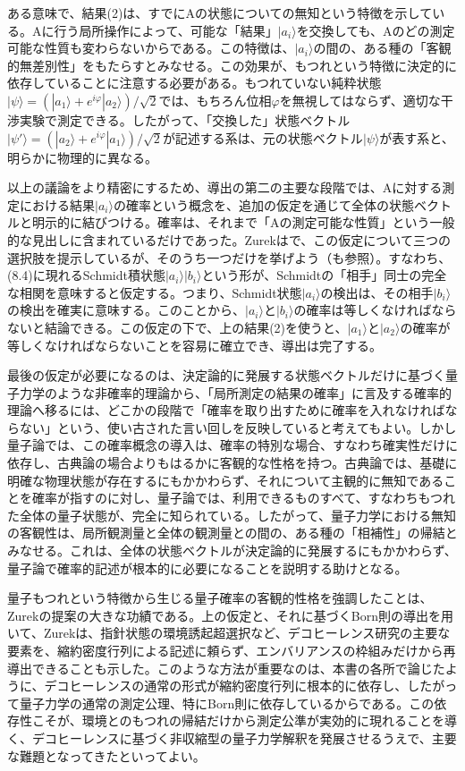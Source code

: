 ある意味で、結果(2)は、すでにAの状態についての無知という特徴を示している。Aに行う局所操作によって、可能な「結果」$|a_i\rangle$を交換しても、Aのどの測定可能な性質も変わらないからである。この特徴は、$|a_i\rangle$の間の、ある種の「客観的無差別性」をもたらすとみなせる。この効果が、もつれという特徴に決定的に依存していることに注意する必要がある。もつれていない純粋状態$|\psi\rangle=(|a_1\rangle+e^{i\varphi}|a_2\rangle)/\sqrt2$では、もちろん位相$\varphi$を無視してはならず、適切な干渉実験で測定できる。したがって、「交換した」状態ベクトル$|\psi'\rangle=(|a_2\rangle+e^{i\varphi}|a_1\rangle)/\sqrt2$が記述する系は、元の状態ベクトル$|\psi\rangle$が表す系と、明らかに物理的に異なる。


\hypertarget{srcpage:343}{}\label{srcpage:343}
以上の議論をより精密にするため、導出の第二の主要な段階では、Aに対する測定における結果$|a_i\rangle$の確率という概念を、追加の仮定を通じて全体の状態ベクトルと明示的に結びつける。確率は、それまで「Aの測定可能な性質」という一般的な見出しに含まれているだけであった。Zurekは\cite{ref067}で、この仮定について三つの選択肢を提示しているが、そのうち一つだけを挙げよう（\cite{ref425}も参照）。すなわち、(8.4)に現れるSchmidt積状態$|a_i\rangle|b_i\rangle$という形が、Schmidtの「相手」同士の完全な相関を意味すると仮定する。つまり、Schmidt状態$|a_i\rangle$の検出は、その相手$|b_i\rangle$の検出を確実に意味する。このことから、$|a_i\rangle$と$|b_i\rangle$の確率は等しくなければならないと結論できる。この仮定の下で、上の結果(2)を使うと、$|a_1\rangle$と$|a_2\rangle$の確率が等しくなければならないことを容易に確立でき\cite{ref067,ref424}、導出は完了する。

最後の仮定が必要になるのは、決定論的に発展する状態ベクトルだけに基づく量子力学のような非確率的理論から、「局所測定の結果の確率」に言及する確率的理論へ移るには、どこかの段階で「確率を取り出すために確率を入れなければならない」\cite{ref424}という、使い古された言い回しを反映していると考えてもよい。しかし量子論では、この確率概念の導入は、確率の特別な場合、すなわち確実性だけに依存し、古典論の場合よりもはるかに客観的な性格を持つ。古典論では、基礎に明確な物理状態が存在するにもかかわらず、それについて主観的に無知であることを確率が指すのに対し、量子論では、利用できるものすべて、すなわちもつれた全体の量子状態が、完全に知られている。したがって、量子力学における無知の客観性は、局所観測量と全体の観測量との間の、ある種の「相補性」の帰結とみなせる\cite{ref067}。これは、全体の状態ベクトルが決定論的に発展するにもかかわらず、量子論で確率的記述が根本的に必要になることを説明する助けとなる。

量子もつれという特徴から生じる量子確率の客観的性格を強調したことは、Zurekの提案の大きな功績である。上の仮定と、それに基づくBorn則の導出を用いて、Zurek\cite{ref067}は、指針状態の環境誘起超選択など、デコヒーレンス研究の主要な要素を、縮約密度行列による記述に頼らず、エンバリアンスの枠組みだけから再導出できることも示した。このような方法が重要なのは、本書の各所で論じたように、デコヒーレンスの通常の形式が縮約密度行列に根本的に依存し、したがって量子力学の通常の測定公理、特にBorn則に依存しているからである。この依存性こそが、環境とのもつれの帰結だけから測定公準が実効的に現れることを導く、デコヒーレンスに基づく非収縮型の量子力学解釈を発展させるうえで、主要な難題となってきたといってよい。


